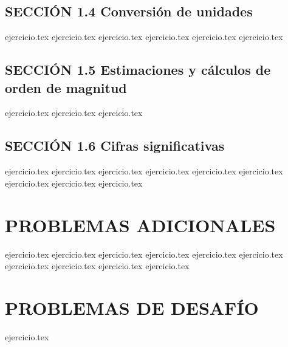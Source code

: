 \subsection*{SECCIÓN 1.4 Conversión de unidades}
\begin{enumerate}
    \setcounter{enumi}{10}
    {ejercicio.tex}
    {ejercicio.tex}
    {ejercicio.tex}
    {ejercicio.tex}
    {ejercicio.tex}
    {ejercicio.tex}
\end{enumerate}

\subsection*{SECCIÓN 1.5 Estimaciones y cálculos de orden de magnitud}
\begin{enumerate}
    \setcounter{enumi}{16}
    {ejercicio.tex}
    {ejercicio.tex}
    {ejercicio.tex}
\end{enumerate}

\subsection*{SECCIÓN 1.6 Cifras significativas}
\begin{enumerate}
    \setcounter{enumi}{19}
    {ejercicio.tex}
    {ejercicio.tex}
    {ejercicio.tex}
    {ejercicio.tex}
    {ejercicio.tex}
    {ejercicio.tex}
    {ejercicio.tex}
    {ejercicio.tex}
    {ejercicio.tex}
\end{enumerate}

\section*{PROBLEMAS ADICIONALES}
\begin{enumerate}
    \setcounter{enumi}{28}
    {ejercicio.tex}
    {ejercicio.tex}
    {ejercicio.tex}
    {ejercicio.tex}
    {ejercicio.tex}
    {ejercicio.tex}
    {ejercicio.tex}
    {ejercicio.tex}
    {ejercicio.tex}
    {ejercicio.tex}
\end{enumerate}

\section*{PROBLEMAS DE DESAFÍO}
\begin{enumerate}
    \setcounter{enumi}{38}
    {ejercicio.tex}
\end{enumerate}
